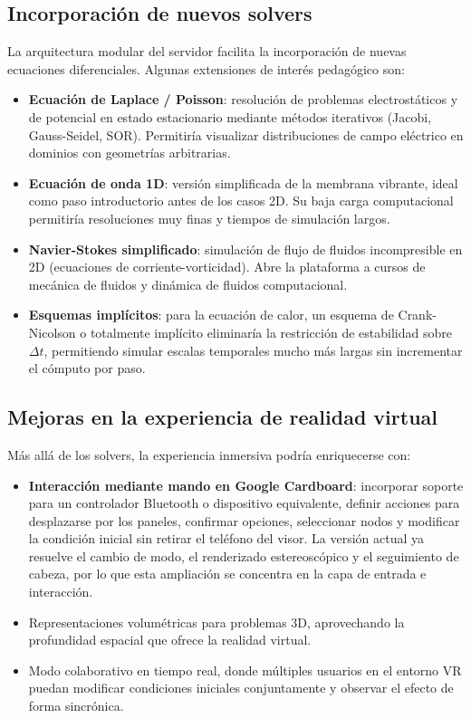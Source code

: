 \documentclass[12pt, a4paper]{article}
\begin{document}
\subsection{Incorporación de nuevos solvers}

La arquitectura modular del servidor facilita la incorporación de nuevas ecuaciones
diferenciales. Algunas extensiones de interés pedagógico son:

\begin{itemize}
    \item \textbf{Ecuación de Laplace / Poisson}: resolución de problemas electrostáticos
    y de potencial en estado estacionario mediante métodos iterativos (Jacobi,
    Gauss-Seidel, SOR). Permitiría visualizar distribuciones de campo eléctrico en
    dominios con geometrías arbitrarias.

    \item \textbf{Ecuación de onda 1D}: versión simplificada de la membrana vibrante,
    ideal como paso introductorio antes de los casos 2D. Su baja carga computacional
    permitiría resoluciones muy finas y tiempos de simulación largos.

    \item \textbf{Navier-Stokes simplificado}: simulación de flujo de fluidos
    incompresible en 2D (ecuaciones de corriente-vorticidad). Abre la plataforma a
    cursos de mecánica de fluidos y dinámica de fluidos computacional.

    \item \textbf{Esquemas implícitos}: para la ecuación de calor, un esquema de
    Crank-Nicolson o totalmente implícito eliminaría la restricción de estabilidad
    sobre $\Delta t$, permitiendo simular escalas temporales mucho más largas sin
    incrementar el cómputo por paso.
\end{itemize}

\subsection{Mejoras en la experiencia de realidad virtual}

Más allá de los solvers, la experiencia inmersiva podría enriquecerse con:

\begin{itemize}
    \item \textbf{Interacción mediante mando en Google Cardboard}: incorporar soporte
    para un controlador Bluetooth o dispositivo equivalente, definir acciones para
    desplazarse por los paneles, confirmar opciones, seleccionar nodos y modificar la
    condición inicial sin retirar el teléfono del visor. La versión actual ya resuelve
    el cambio de modo, el renderizado estereoscópico y el seguimiento de cabeza, por lo
    que esta ampliación se concentra en la capa de entrada e interacción.
    \item Representaciones volumétricas para problemas 3D, aprovechando la profundidad
    espacial que ofrece la realidad virtual.
    \item Modo colaborativo en tiempo real, donde múltiples usuarios en el entorno VR
    puedan modificar condiciones iniciales conjuntamente y observar el efecto de forma
    sincrónica.
\end{itemize}
\end{document}
